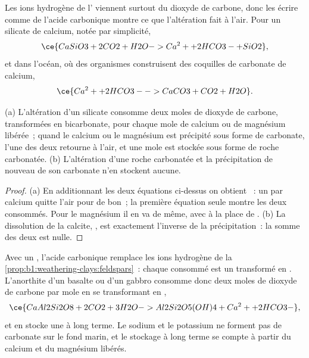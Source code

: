Les ions hydrogène de l' viennent surtout du dioxyde de carbone, donc les écrire
comme de l'acide carbonique montre ce que l'altération fait à l'air. Pour un silicate de calcium,
notée  par simplicité,
\[
  \ce{CaSiO3 + 2 CO2 + H2O -> Ca^2+ + 2 HCO3- + SiO2},
\]
et dans l'océan, où des organismes construisent des coquilles de carbonate de calcium,
\[
  \ce{Ca^2+ + 2 HCO3- -> CaCO3 + CO2 + H2O}.
\]

\begin{proposition}\label{prop:b1:weathering-clays:co2}
(a) L'altération d'un silicate consomme deux moles de dioxyde de carbone, transformées en
bicarbonate, pour chaque mole de calcium ou de magnésium libérée~; quand le calcium
ou le magnésium est précipité sous forme de carbonate, l'une des deux retourne à l'air,
et une mole est stockée sous forme de roche carbonatée. (b) L'altération d'une roche carbonatée et la
précipitation de nouveau de son carbonate n'en stockent aucune.
\end{proposition}

\begin{proof}
(a) En additionnant les deux équations ci-dessus on obtient ~:
un  par calcium quitte l'air pour de bon~; la première équation seule
montre les deux consommés. Pour le magnésium il en va de même, avec  à la place de
. (b) La dissolution de la calcite, , est exactement l'inverse de la précipitation~: la somme des deux est nulle.
\end{proof}

Avec un , l'acide carbonique remplace les ions hydrogène de la
\cref{prop:b1:weathering-clays:feldspars}~: chaque  consommé est un
 transformé en . L'anorthite d'un basalte ou d'un gabbro
consomme donc deux moles de dioxyde de carbone par mole en se transformant en ,
\[
  \ce{CaAl2Si2O8 + 2 CO2 + 3 H2O -> Al2Si2O5(OH)4 + Ca^2+ + 2 HCO3-},
\]
et en stocke une à long terme. Le sodium et le potassium ne forment pas de carbonate sur le
fond marin, et le stockage à long terme se compte à partir du calcium et du magnésium
libérés.

